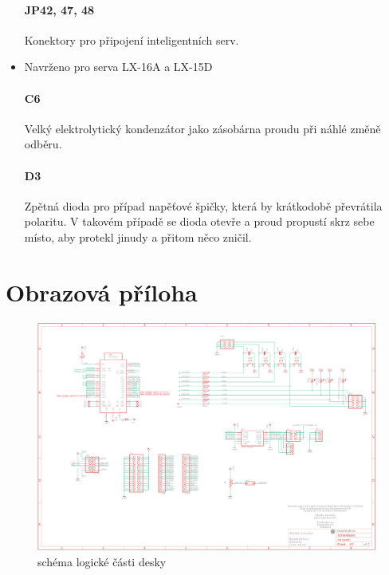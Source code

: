 \documentclass{template/socthesis}
\begin{document}
\begin{itemize}
	\subsubsection*{JP42, 47, 48}
	Konektory pro připojení inteligentních serv.
	\item Navrženo pro serva LX-16A a LX-15D
	
	\subsubsection*{C6}
	Velký elektrolytický kondenzátor jako zásobárna proudu při náhlé změně odběru.
		
	\subsubsection*{D3}
	Zpětná dioda pro případ napěťové špičky, která by krátkodobě převrátila polaritu. V takovém případě se dioda otevře a proud propustí skrz sebe místo, aby protekl jinudy a přitom něco zničil.
	
	\end{itemize}

\chapter{Obrazová příloha}

\begin{figure}[h]
	\centering
	\includegraphics[width=1.5\textwidth, angle = 90]{img/logika.png}
	\caption{schéma logické části desky}
\end{figure}
\end{document}
